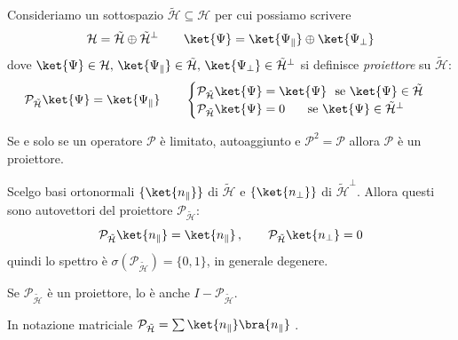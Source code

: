 \begin{definition}
    Consideriamo un sottospazio \(\tilde{\mathcal{H}}\subseteq \mathcal{H}\) per cui possiamo scrivere 
    \begin{equation}
        \mathcal{H} = \tilde{\mathcal{H}} \oplus \tilde{\mathcal{H}}^\perp \qquad 
        \ket{\Psi} = \ket{\Psi_\parallel} \oplus \ket{\Psi_\perp}
    \end{equation}
    dove \(\ket{\Psi} \in \mathcal{H},\,\ket{\Psi_\parallel} \in\tilde{\mathcal{H}},\, \ket{\Psi_\perp}\in\tilde{\mathcal{H}}^\perp\) si definisce
    \textit{proiettore} su \(\tilde{\mathcal{H}}\):
    \begin{equation}
        \mathcal{P}_{\tilde{\mathcal{H}}}\ket{\Psi}= \ket{\Psi_\parallel} \qquad 
    \begin{cases}
        \mathcal{P}_{\tilde{\mathcal{H}}} \ket{\Psi}= \ket{\Psi}   \ \text{ se } \ket{\Psi} \in  \tilde{\mathcal{H}}\\
        \mathcal{P}_{\tilde{\mathcal{H}}} \ket{\Psi}= 0   \quad \, \ \text{ se } \ket{\Psi} \in  \tilde{\mathcal{H}}^\perp
    \end{cases}
    \end{equation}
\end{definition}

\begin{theorem}
    Se e solo se un operatore \(\mathcal{P}\) è limitato, autoaggiunto e \(\mathcal{P}^2=\mathcal{P}\) allora \(\mathcal{P}\) è un proiettore.
\end{theorem}

Scelgo basi ortonormali \(\{\ket{n_\parallel}\}\) di \(\tilde{\mathcal{H}}\) e \(\{\ket{n_\perp}\}\) di \(\tilde{\mathcal{H}}^{\perp}\).
Allora questi sono autovettori del proiettore \(\mathcal{P}_{\tilde{\mathcal{H}}}\):
\[
    \mathcal{P}_{\tilde{\mathcal{H}}}\ket{n_\parallel}= \ket{n_\parallel}\,,\qquad
    \mathcal{P}_{\tilde{\mathcal{H}}}\ket{n_\perp}= 0
\]
quindi lo spettro è \(\sigma(\mathcal{P}_{\tilde{\mathcal{H}}})= \{0,1\}\), in generale degenere.

\begin{remark}
    Se \(\mathcal{P}_{\tilde{\mathcal{H}}} \) è un proiettore, lo è anche \(I- \mathcal{P}_{\tilde{\mathcal{H}}}\).
\end{remark}
\begin{remark}
    In notazione matriciale \(\mathcal{P}_{\tilde{\mathcal{H}}}= \sum \ket{n_\parallel}\bra{n_\parallel}\) .
\end{remark}



